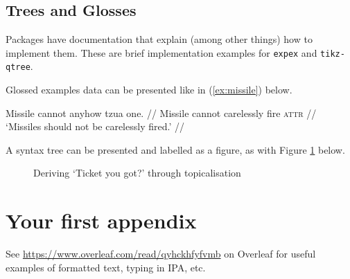 \documentclass[twoside]{memoir}
\begin{document}
\section{Trees and Glosses}

Packages have documentation that explain (among other things) how to implement them. These are brief implementation examples for \texttt{expex} and \texttt{tikz-qtree}. 

Glossed examples data can be presented like in (\ref{ex:missile}) below.

\ex\label{ex:missile}
\begingl
\gla Missile cannot anyhow tzua one. //
\glb Missile cannot carelessly fire \textsc{attr} //
\glft `Missiles should not be carelessly fired.' //
\endgl
\xe

A syntax tree can be presented and labelled as a figure, as with Figure \ref{fig:ticket-topic} below. 

\begin{figure}[h!]
\caption{Deriving `Ticket you got?' through topicalisation}
\centering
{}
\label{fig:ticket-topic}
\end{figure}


\appendix
\chapter{Your first appendix}

See \url{https://www.overleaf.com/read/qyhckhfyfvmb} on Overleaf for useful examples of formatted text, typing in IPA, etc.

\backmatter


\end{document}
